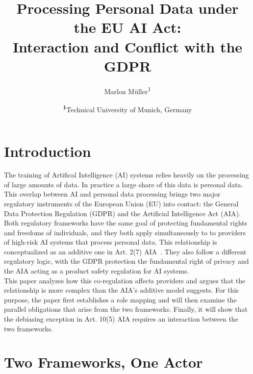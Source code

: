 \documentclass[
	a4paper, %
	10pt, %
	unnumberedsections, %
	twoside, %
]{LTJournalArticle}
\title{Processing Personal Data under the EU AI Act:\\Interaction and Conflict with the GDPR} %
\author{%
	Marlon Müller\textsuperscript{1}
}
\date{\footnotesize\textsuperscript{\textbf{1}}Technical University of Munich, Germany}
\begin{document}
\maketitle %


\section{Introduction}

The training of Artifical Intelligence (AI) systems relies heavily on the processing of large amounts of data. In practice a large share of this data is personal data. This overlap between AI and personal data processing brings two major 
regulatory instruments of the European Union (EU) into contact: the General Data Protection Regulation (GDPR) and the Artificial Intelligence Act (AIA).\\
Both regulatory frameworks have the same goal of protecting fundamental rights and freedoms of individuals, and they both apply simultaneously to to providers of high-risk AI systems that process personal data.
This relationship is conceptualized as an additive one in Art. 2(7) AIA~\cite{euaiact2024}. They also follow a different regulatory logic, with the GDPR protection the fundamental right of privacy and the AIA acting as a product safety regulation for AI systems.\\
This paper analyzes how this co-regulation affects providers and argues that the relationship is more complex than the AIA's additive model suggests. For this purpose, the paper first establishes a role mapping and 
will then examine the parallel obligations that arise from the two frameworks. Finally, it will show that the debiasing exception in Art. 10(5) AIA requires an interaction between the two frameworks.\\

\section{Two Frameworks, One Actor}
\end{document}
